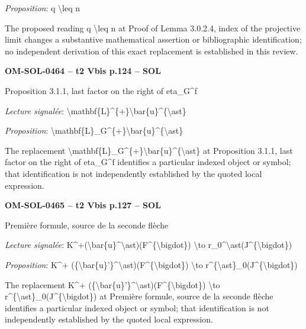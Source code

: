 \emph{Proposition}: q \textbackslash{}leq n\par
The proposed reading q \textbackslash{}leq n at Proof of Lemma 3.0.2.4, index of the projective limit changes a substantive mathematical assertion or bibliographic identification; no independent derivation of this exact replacement is established in this review.\par
\par\noindent\textbf{OM-SOL-0464 -- t2 Vbis p.124 -- SOL}\par
Proposition 3.1.1, last factor on the right of eta\_G\textasciicircum{}f\par
\emph{Lecture signalée}: \textbackslash{}mathbf\{L\}\textasciicircum{}\{+\}\textbackslash{}bar\{u\}\textasciicircum{}\{\textbackslash{}ast\}\par
\emph{Proposition}: \textbackslash{}mathbf\{L\}\_G\textasciicircum{}\{+\}\textbackslash{}bar\{u\}\textasciicircum{}\{\textbackslash{}ast\}\par
The replacement \textbackslash{}mathbf\{L\}\_G\textasciicircum{}\{+\}\textbackslash{}bar\{u\}\textasciicircum{}\{\textbackslash{}ast\} at Proposition 3.1.1, last factor on the right of eta\_G\textasciicircum{}f identifies a particular indexed object or symbol; that identification is not independently established by the quoted local expression.\par
\par\noindent\textbf{OM-SOL-0465 -- t2 Vbis p.127 -- SOL}\par
Première formule, source de la seconde flèche\par
\emph{Lecture signalée}: K\textasciicircum{}+(\textbackslash{}bar\{u\}\textasciicircum{}\textbackslash{}ast)(F\textasciicircum{}\{\textbackslash{}bigdot\}) \textbackslash{}to r\_0\textasciicircum{}\textbackslash{}ast(J\textasciicircum{}\{\textbackslash{}bigdot\})\par
\emph{Proposition}: K\textasciicircum{}+ (\{\textbackslash{}bar\{u\}'\}\textasciicircum{}\textbackslash{}ast)(F\textasciicircum{}\{\textbackslash{}bigdot\}) \textbackslash{}to r\textasciicircum{}\{\textbackslash{}ast\}\_0(J\textasciicircum{}\{\textbackslash{}bigdot\})\par
The replacement K\textasciicircum{}+ (\{\textbackslash{}bar\{u\}'\}\textasciicircum{}\textbackslash{}ast)(F\textasciicircum{}\{\textbackslash{}bigdot\}) \textbackslash{}to r\textasciicircum{}\{\textbackslash{}ast\}\_0(J\textasciicircum{}\{\textbackslash{}bigdot\}) at Première formule, source de la seconde flèche identifies a particular indexed object or symbol; that identification is not independently established by the quoted local expression.\par
